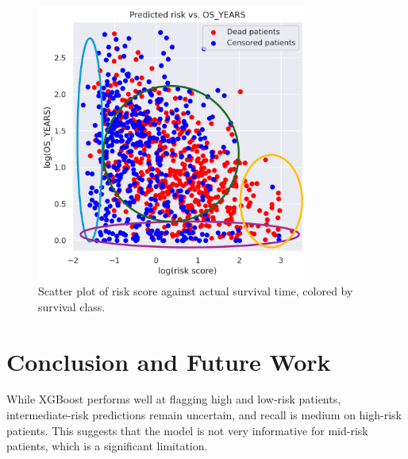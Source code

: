 \documentclass{article}
\begin{document}
\begin{figure}[htbp!]
    \centering
    \includegraphics[width=0.8\textwidth]{img/risk_score_vs_OS_YEARS_annotated.png}
    \caption{Scatter plot of risk score against actual survival time, colored by survival class.}
    \label{fig:precision_recall}
\end{figure}

\section{Conclusion and Future Work}
While XGBoost performs well at flagging high and low-risk patients, intermediate-risk predictions remain uncertain, and recall is medium on high-risk patients. This suggests that the model is not very informative for mid-risk patients, which is a significant limitation.
\end{document}

